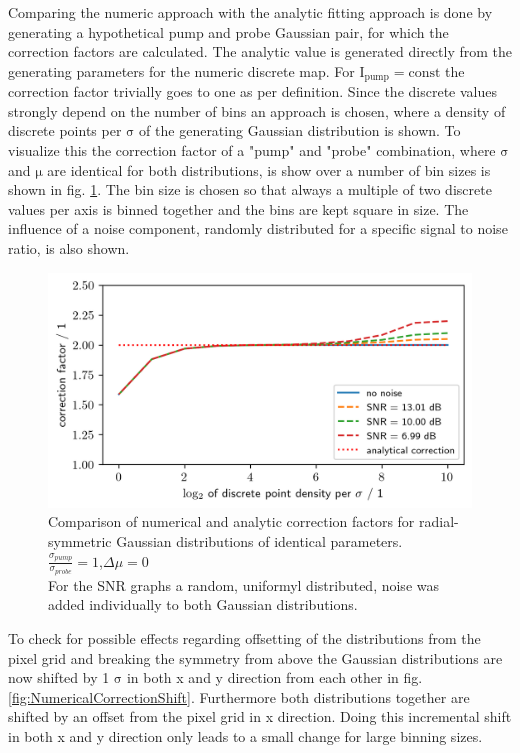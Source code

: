 \documentclass[twoside,openright]{scrreprt}
\begin{document}
Comparing the numeric approach with the analytic fitting approach is done by generating a hypothetical pump and probe Gaussian pair, for which the correction factors are calculated. The analytic value is generated directly from the generating parameters for the numeric discrete map. For $\mathrm{I_{pump} = const}$ the correction factor trivially goes to one as per definition. Since the discrete values strongly depend on the number of bins an approach is chosen, where a density of discrete points per $\mathrm{\sigma}$ of the generating Gaussian distribution is shown. To visualize this the correction factor of a "pump" and "probe" combination, where $\mathrm{\sigma}$ and $\mathrm{\mu}$ are identical for both distributions, is show over a number of bin sizes is shown in fig. \ref{fig:NumericalCorrectionSNR}. The bin size is chosen so that always a multiple of two discrete values per axis is binned together and the bins are kept square in size. The influence of a noise component, randomly distributed for a specific signal to noise ratio, is also shown.

\begin{figure}[h]
\centering
\includegraphics[scale = 1]{images/NumericalCorrectionSNR.png}
\caption{Comparison of numerical and analytic correction factors for radial-symmetric Gaussian distributions of identical parameters. \\$\frac{\sigma_{pump}}{\sigma_{probe}}=1$,$\Delta\mu = 0$\\For the SNR graphs a random, uniformyl distributed, noise was added individually to both Gaussian distributions.\label{fig:NumericalCorrectionSNR}}
\end{figure}

To check for possible effects regarding offsetting of the distributions from the pixel grid and breaking the symmetry from above the Gaussian distributions are now shifted by 1 $\mathrm{\sigma}$ in both x and y direction from each other in fig. \ref{fig:NumericalCorrectionShift}. Furthermore both distributions together are shifted by an offset from the pixel grid in x direction. Doing this incremental shift in both x and y direction only leads to a small change for large binning sizes. 
\end{document}
